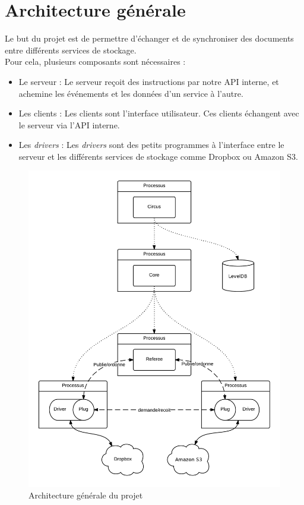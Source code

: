 \section{Architecture générale}
Le but du projet est de permettre d'échanger et de synchroniser des documents entre différents services de stockage.\\

Pour cela, plusieurs composants sont nécessaires :
\begin{itemize}
\renewcommand{\labelitemi}{$\bullet$}
   \item Le serveur : Le serveur reçoit des instructions par notre API interne, et achemine les événements et les données d'un service à l'autre.
   \item Les clients : Les clients sont l'interface utilisateur. Ces clients échangent avec le serveur via l'API interne.
   \item Les \textit{drivers} : Les \textit{drivers} sont des petits programmes à l'interface entre le serveur et les différents services de stockage comme Dropbox ou Amazon S3.
\end{itemize}

\begin{figure}
    \center
    \includegraphics[scale=0.25]{architecture.png}
    \caption{Architecture générale du projet}
\end{figure}

